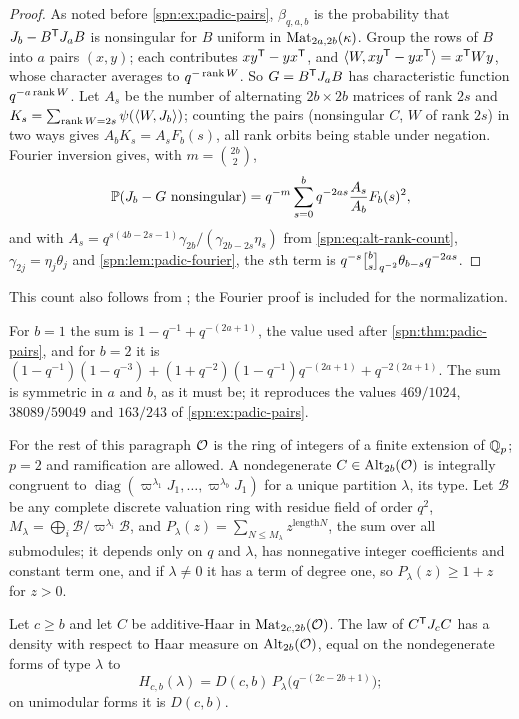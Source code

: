 \begin{proof}
As noted before \cref{spn:ex:padic-pairs}, $\beta_{q,a,b}$ is the probability that $J_b-B^{\mathsf{T}}J_aB$ is
nonsingular for $B$ uniform in $\operatorname{Mat}_{2a,2b}(\kappa)$. Group the rows of $B$ into $a$ pairs $(x,y)$;
each contributes $xy^{\mathsf{T}}-yx^{\mathsf{T}}$, and $\langle W,xy^{\mathsf{T}}-yx^{\mathsf{T}}\rangle=x^{\mathsf{T}}Wy$, whose
character averages to $q^{-\operatorname{rank} W}$. So $G=B^{\mathsf{T}}J_aB$ has characteristic function
$q^{-a\operatorname{rank} W}$. Let $A_s$ be the number of alternating $2b\times2b$ matrices of rank $2s$ and
$K_s=\sum_{\operatorname{rank} W=2s}\psi(\langle W,J_b\rangle)$; counting the pairs (nonsingular $C$, $W$ of rank
$2s$) in two ways gives $A_bK_s=A_sF_b(s)$, all rank orbits being stable under negation. Fourier
inversion gives, with $m=\binom{2b}2$,
\[
 \mathbb{P}(J_b-G\text{ nonsingular})=q^{-m}\sum_{s=0}^bq^{-2as}\frac{A_s}{A_b}F_b(s)^2,
\]
and with $A_s=q^{s(4b-2s-1)}\gamma_{2b}/(\gamma_{2b-2s}\eta_s)$ from \eqref{spn:eq:alt-rank-count},
$\gamma_{2j}=\eta_j\theta_j$ and \cref{spn:lem:padic-fourier}, the $s$th term is
$q^{-s}\spnqbin bs{q^{-2}}\theta_{b-s}q^{-2as}$.
\end{proof}

This count also follows from \cite[Theorem~4.6]{DeBoeckVandeVoorde2024Anzahl}; the Fourier proof is
included for the normalization.

For $b=1$ the sum is $1-q^{-1}+q^{-(2a+1)}$, the value used after \cref{spn:thm:padic-pairs}, and for
$b=2$ it is $(1-q^{-1})(1-q^{-3})+(1+q^{-2})(1-q^{-1})q^{-(2a+1)}+q^{-2(2a+1)}$. The sum is symmetric in
$a$ and $b$, as it must be; it reproduces the values $469/1024$, $38089/59049$ and $163/243$ of
\cref{spn:ex:padic-pairs}.

For the rest of this paragraph $\mathcal{O}$ is the ring of integers of a finite extension of $\mathbb{Q}_p$; $p=2$ and
ramification are allowed. A nondegenerate $C\in\operatorname{Alt}_{2b}(\mathcal{O})$ is integrally congruent to
$\operatorname{diag}(\varpi^{\lambda_1}J_1,\dots,\varpi^{\lambda_b}J_1)$ for a unique partition
$\lambda$, its type. Let $\mathcal B$ be any complete discrete valuation ring with residue field of order
$q^2$, $M_\lambda=\bigoplus_i\mathcal B/\varpi^{\lambda_i}\mathcal B$, and
$P_\lambda(z)=\sum_{N\le M_\lambda}z^{\mathrm{length}N}$, the sum over all submodules; it depends only
on $q$ and $\lambda$, has nonnegative integer coefficients and constant term one, and if $\lambda\ne0$ it
has a term of degree one, so $P_\lambda(z)\ge1+z$ for $z>0$.

\begin{lemma}\label{spn:lem:padic-density}
Let $c\ge b$ and let $C$ be additive-Haar in $\operatorname{Mat}_{2c,2b}(\mathcal{O})$. The law of $C^{\mathsf{T}}J_cC$ has a
density with respect to Haar measure on $\operatorname{Alt}_{2b}(\mathcal{O})$, equal on the nondegenerate forms of type
$\lambda$ to
\[
 H_{c,b}(\lambda)=D(c,b)\,P_\lambda\bigl(q^{-(2c-2b+1)}\bigr);
\]
on unimodular forms it is $D(c,b)$.
\end{lemma}

